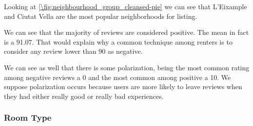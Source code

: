 
Looking at \ref{\fig:neighbourhood_group_cleansed-pie} we can see that L'Eixample
and Ciutat Vella are the most popular neighborhoods for listing.




We can see that the majority of reviews are considered positive. The mean in fact is 
a 91.07. That would explain why a common technique among renters is to consider 
any review lower than 90 as negative. 

We can see as well that there is some polarization, being the most common rating among 
negative reviews a 0 and the most common among positive a 10. We suppose polarization occurs
because users are more likely to leave reviews when they had either really good or 
really bad experiences.





\pagebreak
\subsubsection{Room Type}

